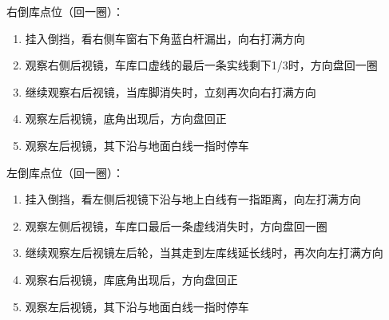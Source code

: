 \noindent
右倒库点位（回一圈）：

\begin{enumerate}
    \item 挂入倒挡，看右侧车窗右下角蓝白杆漏出，向右打满方向
    \item 观察右侧后视镜，车库口虚线的最后一条实线剩下1/3时，方向盘回一圈
    \item 继续观察右后视镜，当库脚消失时，立刻再次向右打满方向
    \item 观察左后视镜，底角出现后，方向盘回正
    \item 观察左后视镜，其下沿与地面白线一指时停车
\end{enumerate}

\noindent
左倒库点位（回一圈）：

\begin{enumerate}
    \item 挂入倒挡，看左侧后视镜下沿与地上白线有一指距离，向左打满方向
    \item 观察左侧后视镜，车库口最后一条虚线消失时，方向盘回一圈
    \item 继续观察左后视镜左后轮，当其走到左库线延长线时，再次向左打满方向
    \item 观察右后视镜，库底角出现后，方向盘回正
    \item 观察左后视镜，其下沿与地面白线一指时停车
\end{enumerate}
